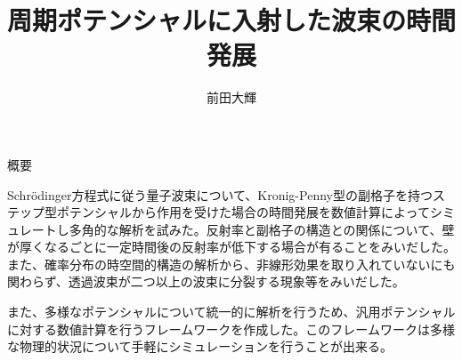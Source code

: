 \documentclass[a4paper, lualatex]{bxjsarticle}
\title{周期ポテンシャルに入射した波束の時間発展}
\author{前田大輝}
\begin{document}
\maketitle
\newpage
\tableofcontents
\newpage
\begin{section}{概要}
    \par Schrödinger方程式に従う量子波束について、Kronig-Penny型の副格子を持つステップ型ポテンシャルから作用を受けた場合の時間発展を数値計算によってシミュレートし多角的な解析を試みた。反射率と副格子の構造との関係について、壁が厚くなるごとに一定時間後の反射率が低下する場合が有ることをみいだした。また、確率分布の時空間的構造の解析から、非線形効果を取り入れていないにも関わらず、透過波束が二つ以上の波束に分裂する現象等をみいだした。
    \par また、多様なポテンシャルについて統一的に解析を行うため、汎用ポテンシャルに対する数値計算を行うフレームワークを作成した。このフレームワークは多様な物理的状況について手軽にシミュレーションを行うことが出来る。
\end{section}
\end{document}
